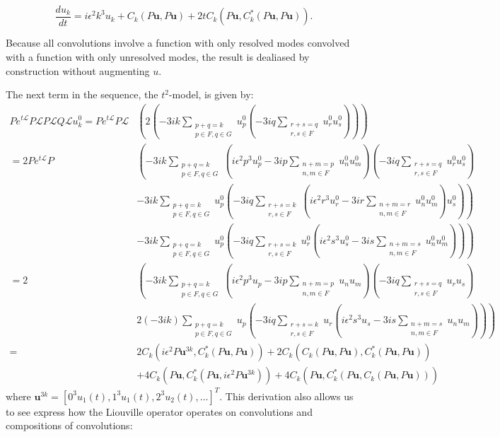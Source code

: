 \documentclass{article}
\begin{document}
\begin{equation}
\frac{du_k}{dt}=i\epsilon^2 k^3u_k+C_k(P\mathbf{u},P\mathbf{u}) + 2tC_k(P\mathbf{u},C_k^*(P\mathbf{u},P\mathbf{u})).\label{tmodel}
\end{equation}

Because all convolutions involve a function with only resolved modes convolved with a function with only unresolved modes, the result is dealiased by construction without augmenting $u$.

The next term in the sequence, the $t^2$-model, is given by:
\begin{align*}
Pe^{t\mathcal{L}}P\mathcal{L}P\mathcal{L}Q\mathcal{L}u_k^0 = Pe^{t\mathcal{L}}P\mathcal{L}&\left(2\left(-3ik\sum_{\substack{p+q=k\\p\in F,q\in G}}u_p^0\left(-3iq\sum_{\substack{r+s=q\\r,s\in F}}u_r^0u_s^0\right)\right)\right)\\
= 2Pe^{t\mathcal{L}}P&\left(-3ik\sum_{\substack{p+q = k\\p\in F,q\in G}} \left(i\epsilon^2 p^3u_p^0-3ip\sum_{\substack{n+m = p\\n,m\in F}}u_n^0u_m^0\right)\left(-3iq\sum_{\substack{r+s = q\\r,s\in F}}u_r^0u_s^0\right)\right.\\
&\left.-3ik\sum_{\substack{p+q = k\\p\in F,q\in G}} u_p^0 \left(-3iq\sum_{\substack{r+s = k\\r,s\in F}}\left(i\epsilon^2r^3 u_r^0-3ir\sum_{\substack{n+m = r\\n,m\in F}}u_n^0u_m^0\right)u_s^0\right)\right)\\
&\left.-3ik\sum_{\substack{p+q = k\\p\in F,q\in G}} u_p^0 \left(-3iq\sum_{\substack{r+s = k\\r,s\in F}}u_r^0\left(i\epsilon^2s^3 u_s^0-3is\sum_{\substack{n+m = s\\n,m\in F}}u_n^0u_m^0\right)\right)\right)\\
=2&\left(-3ik\sum_{\substack{p+q = k\\p\in F,q\in G}} \left(i\epsilon^2 p^3u_p-3ip\sum_{\substack{n+m = p\\n,m\in F}}u_nu_m\right)\left(-3iq\sum_{\substack{r+s = q\\r,s\in F}}u_ru_s\right)\right.
\\
&\left.2(-3ik)\sum_{\substack{p+q = k\\p\in F,q\in G}} u_p \left(-3iq\sum_{\substack{r+s = k\\r,s\in F}}u_r\left(i\epsilon^2s^3 u_s-3is\sum_{\substack{n+m = s\\n,m\in F}}u_nu_m\right)\right)\right)\\
=&2C_k(i\epsilon^2 P\mathbf{u}^{3k},C_k^*(P\mathbf{u},P\mathbf{u})) + 2C_k(C_k(P\mathbf{u},P\mathbf{u}),C_k^*(P\mathbf{u},P\mathbf{u}))\\
&+4C_k(P\mathbf{u},C_k^*(P\mathbf{u},i\epsilon^2 P\mathbf{u}^{3k})) + 4C_k(P\mathbf{u},C_k^*(P\mathbf{u},C_k(P\mathbf{u},P\mathbf{u})))
\end{align*}where $\mathbf{u}^{3k} = [0^3u_1(t),1^3u_1(t),2^3u_2(t),\dots]^T$. This derivation also allows us to see express how the Liouville operator operates on convolutions and compositions of convolutions:
\end{document}
